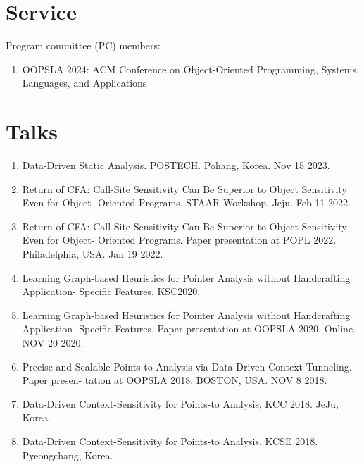 \documentclass[letterpaper,11pt]{article}
\begin{document}
\section{Service}
Program committee (PC) members:
\begin{enumerate}
\item{OOPSLA 2024: ACM Conference on Object-Oriented Programming, Systems, Languages, and Applications}
\end{enumerate}


\section{Talks}

\begin{enumerate}
  \item{Data-Driven Static Analysis. POSTECH. Pohang, Korea. Nov 15 2023.}

  \item{Return of CFA: Call-Site Sensitivity Can Be Superior to Object Sensitivity Even for Object- Oriented Programs. STAAR Workshop. Jeju. Feb 11 2022.}

  \item{Return of CFA: Call-Site Sensitivity Can Be Superior to Object Sensitivity Even for Object- Oriented Programs. Paper presentation at POPL 2022. Philadelphia,  USA. Jan 19 2022.}
 
  \item{Learning Graph-based Heuristics for Pointer Analysis without Handcrafting Application- Specific Features. KSC2020.}
 
  \item{Learning Graph-based Heuristics for Pointer Analysis without Handcrafting Application- Specific Features. Paper presentation at OOPSLA 2020. Online. NOV 20 2020.}
 
  \item{Precise and Scalable Points-to Analysis via Data-Driven Context Tunneling. Paper presen- tation at OOPSLA 2018. BOSTON, USA. NOV 8 2018.}
 
  \item{Data-Driven Context-Sensitivity for Points-to Analysis, KCC 2018. JeJu, Korea.}
 
  \item{Data-Driven Context-Sensitivity for Points-to Analysis, KCSE 2018. Pyeongchang, Korea.}
\end{enumerate}

\end{document}
